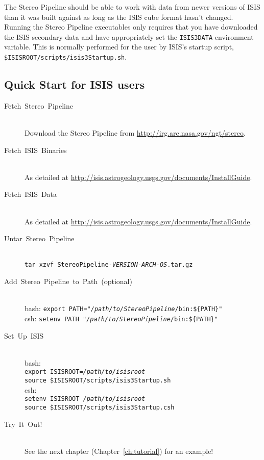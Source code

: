 \begin{description}
The Stereo Pipeline should be able to work with data from newer
versions of ISIS than it was built against as long as the ISIS cube
format hasn't changed. Running the Stereo Pipeline executables only
requires that you have downloaded the ISIS secondary data and have
appropriately set the \texttt{ISIS3DATA} environment variable. This
is normally performed for the user by ISIS's startup script,
\texttt{\$ISISROOT/scripts/isis3Startup.sh}.

\end{description}

\subsection{Quick Start for ISIS users}
\begin{description}

\item[{Fetch~Stereo~Pipeline}] ~\\
Download the Stereo Pipeline from \url{http://irg.arc.nasa.gov/ngt/stereo}.

\item [{Fetch~ISIS~Binaries}] ~\\
As detailed at \url{http://isis.astrogeology.usgs.gov/documents/InstallGuide}.

\item [{Fetch~ISIS~Data}] ~\\
As detailed at \url{http://isis.astrogeology.usgs.gov/documents/InstallGuide}.

\item [{Untar~Stereo~Pipeline}] ~\\
\texttt{tar xzvf StereoPipeline-\textit{VERSION-ARCH-OS}.tar.gz}

\item [{Add~Stereo~Pipeline~to~Path~(optional)}] ~\\
bash: \texttt{export PATH="\textit{/path/to/StereoPipeline}/bin:\$\{PATH\}"} \\
csh:  \texttt{setenv PATH "\textit{/path/to/StereoPipeline}/bin:\$\{PATH\}"}

\item[Set~Up~ISIS] ~\\
bash: \\
\hspace*{2em}\texttt{export ISISROOT=\textit{/path/to/isisroot}} \\
\hspace*{2em}\texttt{source \$ISISROOT/scripts/isis3Startup.sh} \\
csh: \\
\hspace*{2em}\texttt{setenv ISISROOT \textit{/path/to/isisroot}} \\
\hspace*{2em}\texttt{source \$ISISROOT/scripts/isis3Startup.csh}

\item [{Try~It~Out!}] ~\\
See the next chapter (Chapter~\ref{ch:tutorial}) for an example!
\end{description}

